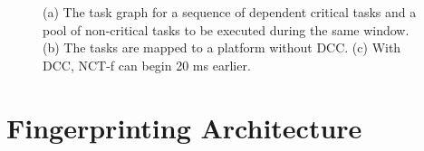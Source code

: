 \begin{figure}[tb]
\centering
{} \\
 \\
\caption[An example task graph for a mixed-criticality system]{(a) The task graph for a sequence of dependent critical tasks and a pool of non-critical tasks to be executed during the same window. (b) The tasks are mapped to a platform without DCC. (c) With DCC, NCT-f can begin 20 ms earlier.}
\label{f:schedule}
\end{figure}

\section{Fingerprinting Architecture}

